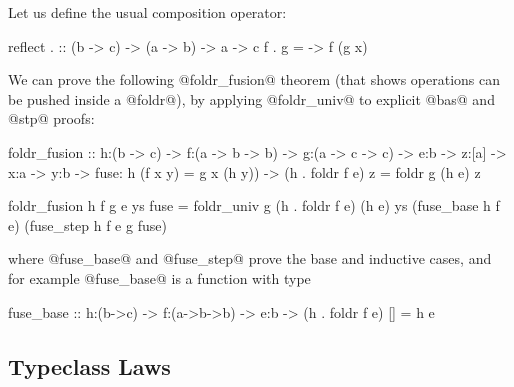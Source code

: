 %
Let us define the usual composition operator:
%
\begin{code}
reflect . :: (b -> c) -> (a -> b) -> a -> c
f . g     = \x -> f (g x)
\end{code}
%
We can prove the following @foldr_fusion@ theorem
(that shows operations can be pushed inside a @foldr@),
by applying @foldr_univ@ to explicit @bas@ and @stp@ proofs:
%
\begin{code}
  foldr_fusion
   :: h:(b -> c)
   -> f:(a -> b -> b)
   -> g:(a -> c -> c)
   -> e:b -> z:[a] -> x:a -> y:b
   -> fuse: {h (f x y) = g x (h y)})
   -> {(h . foldr f e) z = foldr g (h e) z}

  foldr_fusion h f g e ys fuse
    = foldr_univ g (h . foldr f e) (h e) ys
        (fuse_base h f e)
        (fuse_step h f e g fuse)
\end{code}
%
where @fuse_base@ and @fuse_step@ prove the
base and inductive cases, and for example
@fuse_base@ is a function with type
%
\begin{code}
fuse_base :: h:(b->c) -> f:(a->b->b) -> e:b
          -> {(h . foldr f e) [] = h e}
\end{code}

\subsection{Typeclass Laws}

